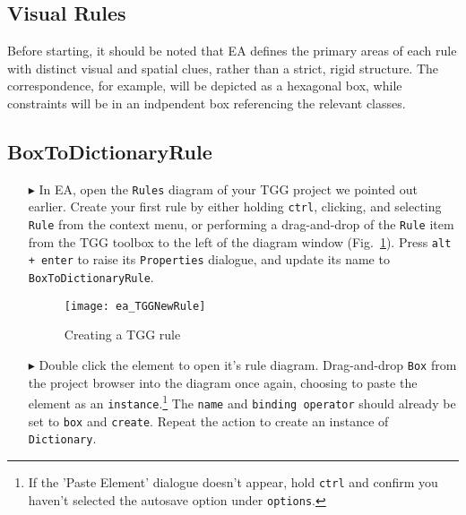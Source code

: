 \newpage
\hypertarget{rules vis}{}
\subsection{Visual Rules}
\visHeader

Before starting, it should be noted that EA defines the primary areas of each rule with distinct visual and spatial clues, rather than a strict, rigid
structure. The correspondence, for example, will be depicted as a hexagonal box, while constraints will be in an indpendent box referencing the relevant
classes.

\subsection{BoxToDictionaryRule}

\begin{enumerate}

\item[$\blacktriangleright$] In EA, open the \texttt{Rules} diagram of your TGG project we pointed out earlier. Create your first rule by either holding
\texttt{ctrl}, clicking, and selecting \texttt{Rule} from the context menu, or performing a drag-and-drop of the \texttt{Rule} item from the TGG toolbox to the
left of the diagram window (Fig.~\ref{ea:create_tgg_rule}). Press \texttt{alt + enter} to raise its \texttt{Properties} dialogue, and update its name to
\texttt{BoxToDictionaryRule}.

\vspace{0.5cm}

\begin{figure}[htbp]
\begin{center}
  \texttt{[image: ea\_TGGNewRule]}
  \caption{Creating a TGG rule}
  \label{ea:create_tgg_rule}
\end{center}
\end{figure}

\item[$\blacktriangleright$] Double click the element to open it's rule diagram. Drag-and-drop \texttt{Box} from the project browser into the diagram once
again, choosing to paste the element as an \texttt{instance}.\footnote{If the 'Paste Element' dialogue doesn't appear, hold \texttt{ctrl} and confirm you
haven't selected the autosave option under \texttt{options}.} The \texttt{name} and \texttt{binding operator} should already be set to \texttt{box} and
\texttt{create}. Repeat the action to create an instance of \texttt{Dictionary}.


\end{enumerate}
